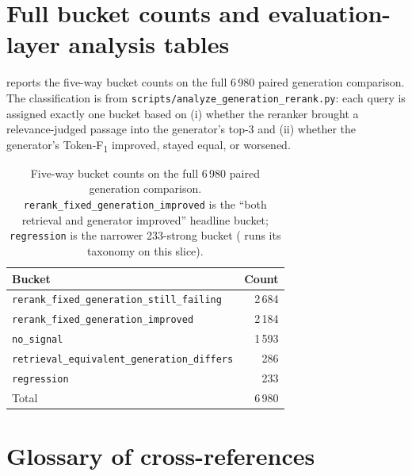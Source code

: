 \documentclass[11pt,a4paper]{article}
\newcommand{\fdev}{6\,980}
\newcommand{\F}{F\textsubscript{1}}
\newcommand{\Tokenf}{Token-\F}
\begin{document}
\section{Full bucket counts and evaluation-layer analysis tables}
\label{sec:appendix-buckets}

 reports the five-way bucket counts on the
full \fdev{} paired generation comparison.  The classification is from
\texttt{scripts/analyze\_generation\_rerank.py}: each query is
assigned exactly one bucket based on (i) whether the reranker
brought a relevance-judged passage into the generator's top-3 and
(ii) whether the generator's \Tokenf{} improved, stayed equal,
or worsened.

\begin{table}[H]
  \centering
  \caption{Five-way bucket counts on the full \fdev{} paired generation
  comparison.  \texttt{rerank\_fixed\_generation\_improved} is the
  ``both retrieval and generator improved'' headline bucket;
  \texttt{regression} is the narrower 233-strong bucket
  ( runs its taxonomy on this slice).}
  \label{tab:buckets-full}
  \begin{tabular}{lr}
    \toprule
    Bucket                                                       & Count \\
    \midrule
    \texttt{rerank\_fixed\_generation\_still\_failing}           & 2\,684 \\
    \texttt{rerank\_fixed\_generation\_improved}                 & 2\,184 \\
    \texttt{no\_signal}                                          & 1\,593 \\
    \texttt{retrieval\_equivalent\_generation\_differs}          &   286 \\
    \texttt{regression}                                          &   233 \\
    \midrule
    Total                                                        & 6\,980 \\
    \bottomrule
  \end{tabular}
\end{table}

\section{Glossary of cross-references}
\label{sec:appendix-glossary}
\end{document}
